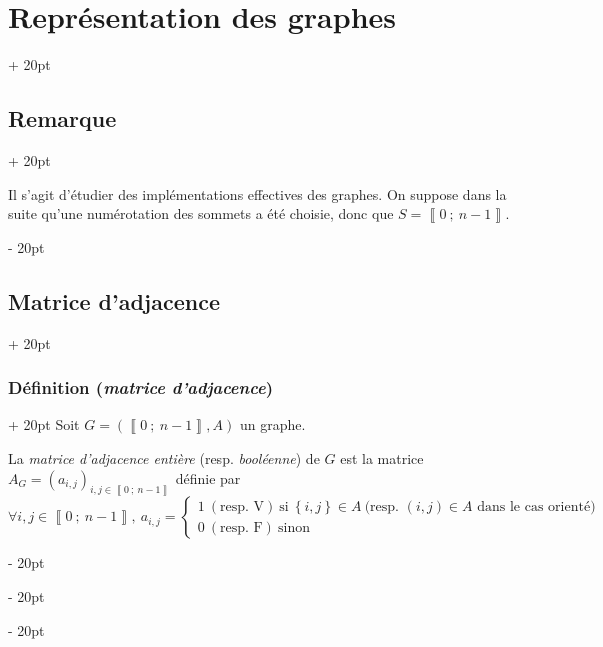 \documentclass[a4paper, 12pt, twoside]{article}
\newcommand{\nset}[2]{\left\llbracket #1\ ;\ #2 \right\rrbracket}
\newcommand{\set}[1]{\left\{ #1 \right\}}
\newcommand{\ind}[1][20pt]{\advance\leftskip + #1}
\newcommand{\deind}[1][20pt]{\advance\leftskip - #1}
\newenvironment{indt}[2][20pt]{#2 \par \ind[#1]}{\par \deind} %
\begin{document}
    \begin{indt}{\section{Représentation des graphes}}
        
        \setcounter{subsection}{-1}
        
        \begin{indt}{\subsection{Remarque}}

            Il s'agit d'étudier des implémentations effectives des graphes. On suppose dans la suite qu'une numérotation des sommets a été choisie, donc que $S = \nset{0}{n - 1}$.
        \end{indt}

        \vspace{12pt}
        
        \begin{indt}{\subsection{Matrice d'adjacence}}
            \begin{indt}{\subsubsection{Définition (\textit{matrice d'adjacence})}}
                Soit $G = (\nset{0}{n - 1}, A)$ un graphe.

                La \textit{matrice d'adjacence entière} (resp. \textit{booléenne}) de $G$ est la matrice $A_G = (a_{i,j})_{i, j \in \nset{0}{n - 1}}$ définie par
                \[
                    \forall i, j \in \nset{0}{n - 1},\ a_{i,j} =
                    \begin{cases}
                        1\ (\text{resp. V})\ \text{si}\ \set{i, j} \in A\ \text{(resp. $(i, j) \in A$ dans le cas orienté)}
                        \\
                        0\ (\text{resp. F})\ \text{sinon}
                    \end{cases}
                \]
                
            \end{indt}

            \vspace{12pt}
            

\end{indt}
\end{indt}
\end{document}
